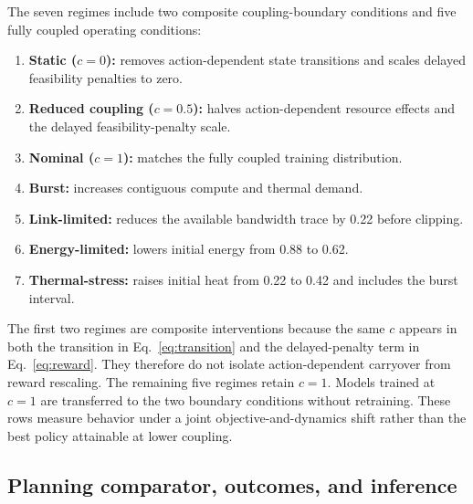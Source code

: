 \documentclass[11pt]{article}
\begin{document}
\color{red}%
The seven regimes include two composite coupling-boundary conditions and five fully coupled operating conditions:
\color{black}%

\begin{enumerate}[leftmargin=1.6em]
\color{red}%
    \item \textbf{Static ($c=0$):} removes action-dependent state transitions and scales delayed feasibility penalties to zero.
    \item \textbf{Reduced coupling ($c=0.5$):} halves action-dependent resource effects and the delayed feasibility-penalty scale.
\color{black}%
    \item \textbf{Nominal ($c=1$):} matches the fully coupled training distribution.
    \item \textbf{Burst:} increases contiguous compute and thermal demand.
    \item \textbf{Link-limited:} reduces the available bandwidth trace by 0.22 before clipping.
    \item \textbf{Energy-limited:} lowers initial energy from 0.88 to 0.62.
    \item \textbf{Thermal-stress:} raises initial heat from 0.22 to 0.42 and includes the burst interval.
\end{enumerate}

\color{red}%
The first two regimes are composite interventions because the same $c$ appears in both the transition in Eq.~\eqref{eq:transition} and the delayed-penalty term in Eq.~\eqref{eq:reward}. They therefore do not isolate action-dependent carryover from reward rescaling. The remaining five regimes retain $c=1$. Models trained at $c=1$ are transferred to the two boundary conditions without retraining. These rows measure behavior under a joint objective-and-dynamics shift rather than the best policy attainable at lower coupling.
\color{black}%

\subsection{Planning comparator, outcomes, and inference}
\end{document}
